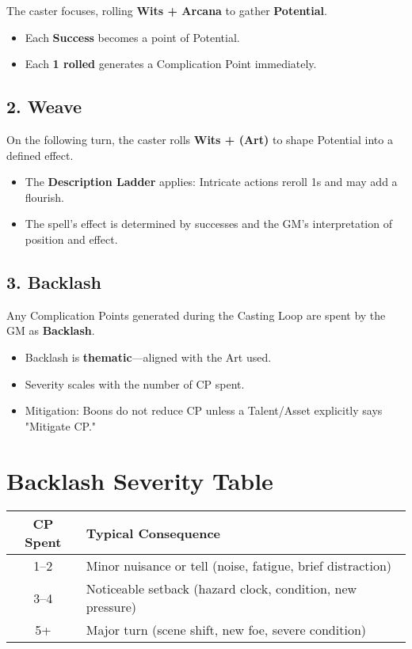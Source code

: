 The caster focuses, rolling \textbf{Wits + Arcana} to gather \textbf{Potential}.

\begin{itemize}
  \item Each \textbf{Success} becomes a point of Potential.
  \item Each \textbf{1 rolled} generates a Complication Point immediately.
\end{itemize}

\subsection*{2. Weave}

On the following turn, the caster rolls \textbf{Wits + (Art)} to shape Potential into a defined effect.

\begin{itemize}
  \item The \textbf{Description Ladder} applies: Intricate actions reroll 1s and may add a flourish.
  \item The spell's effect is determined by successes and the GM's interpretation of position and effect.
\end{itemize}

\subsection*{3. Backlash}

Any Complication Points generated during the Casting Loop are spent by the GM as \textbf{Backlash}.

\begin{itemize}
  \item Backlash is \textbf{thematic}—aligned with the Art used.
  \item Severity scales with the number of CP spent.
  \item Mitigation: Boons do not reduce CP unless a Talent/Asset explicitly says "Mitigate CP."
\end{itemize}

\section{Backlash Severity Table}

\begin{center}
\begin{tabular}{cl}
\toprule
\textbf{CP Spent} & \textbf{Typical Consequence} \\
\midrule
1–2 & Minor nuisance or tell (noise, fatigue, brief distraction) \\
3–4 & Noticeable setback (hazard clock, condition, new pressure) \\
5+ & Major turn (scene shift, new foe, severe condition) \\
\bottomrule
\end{tabular}
\end{center}

